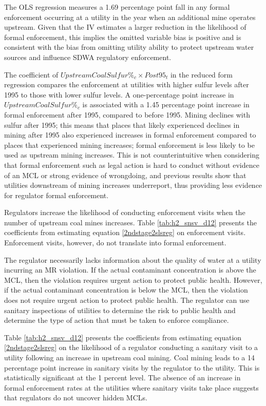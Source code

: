 \documentclass[12pt]{article}
\begin{document}
The OLS regression measures a 1.69 percentage point fall in any formal enforcement occurring at a utility in the year when an additional mine operates upstream. Given that the IV estimates a larger reduction in the likelihood of formal enforcement, this implies the omitted variable bias is positive and is consistent with the bias from omitting utility ability to protect upstream water sources and influence SDWA regulatory enforcement. 

The coefficient of $UpstreamCoalSulfur\%_c \times Post95_t$ in the reduced form regression compares the enforcement at utilities with higher sulfur levels after 1995 to those with lower sulfur levels. A one-percentage point increase in $UpstreamCoalSulfur\%_c$ is associated with a 1.45 percentage point increase in formal enforcement after 1995, compared to before 1995. Mining declines with sulfur after 1995; this means that places that likely experienced declines in mining after 1995 also experienced increases in formal enforcement compared to places that experienced mining increases; formal enforcement is less likely to be used as upstream mining increases. This is not counterintuitive when considering that formal enforcement such as legal action is hard to conduct without evidence of an MCL or strong evidence of wrongdoing, and previous results show that utilities downstream of mining increases underreport, thus providing less evidence for regulator formal enforcement.

Regulators increase the likelihood of conducting enforcement visits when the number of upstream coal mines increases. Table \ref{tab:h2_snsv_d12} presents the coefficients from estimating equation \ref{2ndstage2slsreg} on enforcement visits. Enforcement visits, however, do not translate into formal enforcement.

The regulator necessarily lacks information about the quality of water at a utility incurring an MR violation. If the actual contaminant concentration is above the MCL, then the violation requires urgent action to protect public health. However, if the actual contaminant concentration is below the MCL, then the violation does not require urgent action to protect public health. The regulator can use sanitary inspections of utilities to determine the risk to public health and determine the type of action that must be taken to enforce compliance.

Table \ref{tab:h2_snsv_d12} presents the coefficients from estimating equation \ref{2ndstage2slsreg} on the likelihood of a regulator conducting a sanitary visit to a utility following an increase in upstream coal mining. Coal mining leads to a 14 percentage point increase in sanitary visits by the regulator to the utility. This is statistically significant at the 1 percent level. The absence of an increase in formal enforcement rates at the utilities where sanitary visits take place suggests that regulators do not uncover hidden MCLs.
\end{document}
